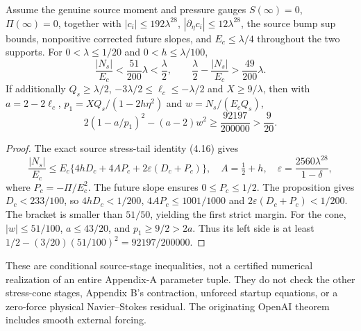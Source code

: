 \begin{theorem}
\label{thm:a11-short-tail-new}
Assume the genuine source moment and pressure gauges
$S(\infty)=0$, $\Pi(\infty)=0$, together with
$|c_i|\le192\lambda^{28}$,
$|\partial_\eta c_i|\le12\lambda^{28}$,
the source bump sup bounds, nonpositive corrected future slopes,
and $E_c\le\lambda/4$ throughout the two supports.
For $0<\lambda\le1/20$ and $0<h\le\lambda/100$,
\[
\frac{|N_s|}{E_c}<\frac{51}{200}\lambda<\frac{\lambda}{2},
\qquad \frac{\lambda}{2}-\frac{|N_s|}{E_c}>
 \frac{49}{200}\lambda.
\]
If additionally $Q_s\ge\lambda/2$,
$-3\lambda/2\le\ell_c\le-\lambda/2$ and $X\ge9/\lambda$,
then with $a=2-2\ell_c$,
$p_1=XQ_s/(1-2h\eta^2)$ and $w=N_s/(E_cQ_s)$,
\[
2(1-a/p_1)^2-(a-2)w^2\ge
\frac{92197}{200000}>\frac9{20}.
\]
\end{theorem}
\begin{proof}
The exact source stress-tail identity (4.16) gives
\[
\frac{|N_s|}{E_c}\le E_c\{
4hD_c+4AP_c+2\varepsilon(D_c+P_c)\},
\quad A=\tfrac12+h,\quad
\varepsilon=\frac{2560\lambda^{28}}{1-\delta},
\]
where $P_c=-\Pi/E_c^2$. The future slope ensures
$0\le P_c\le1/2$. The proposition gives $D_c<233/100$,
so $4hD_c<1/200$, $4AP_c\le1001/1000$ and
$2\varepsilon(D_c+P_c)<1/200$.
The bracket is smaller than $51/50$, yielding the first
strict margin. For the cone,
$|w|\le51/100$, $a\le43/20$, and $p_1\ge9/2>2a$.
Thus its left side is at least
$1/2-(3/20)(51/100)^2=92197/200000$.
\end{proof}
These are conditional source-stage inequalities, not a certified
numerical realization of an entire Appendix-A parameter tuple.
They do not check the other stress-cone stages, Appendix B's
contraction, unforced startup equations, or a zero-force physical
Navier--Stokes residual. The originating OpenAI theorem includes
smooth external forcing.
